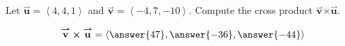 \documentclass{ximera}
\author{Gregory Hartman \and Matthew Carr}
\begin{document}
\begin{exercise}
Let $\overset{\boldsymbol{\rightharpoonup}}{\mathbf{u}} = \left< 4,4,1 \right>$ and $\overset{\boldsymbol{\rightharpoonup}}{\mathbf{v}} = \left< -4,7,-10 \right>$. Compute the cross product $\overset{\boldsymbol{\rightharpoonup}}{\mathbf{v}}  \boldsymbol\times \overset{\boldsymbol{\rightharpoonup}}{\mathbf{u}}$.

\begin{prompt}
\[
\overset{\boldsymbol{\rightharpoonup}}{\mathbf{v}} \boldsymbol\times \overset{\boldsymbol{\rightharpoonup}}{\mathbf{u}} = \left< \answer{47},\answer{-36},\answer{-44} \right> 
\]
\end{prompt}


\end{exercise}
\end{document}
